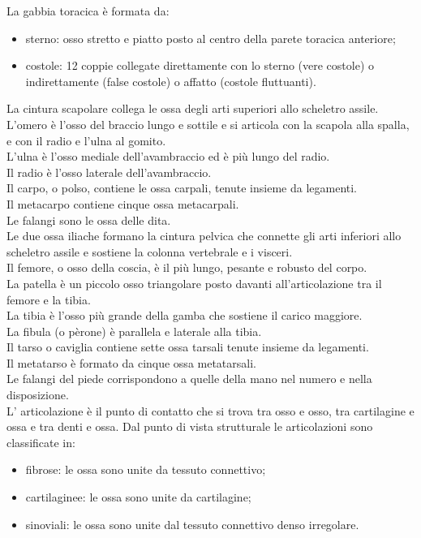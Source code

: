 \documentclass[a4paper]{article}
\begin{document}
La gabbia toracica è formata da:
\begin{itemize}
\item sterno: osso stretto e piatto posto al centro della parete toracica anteriore;
\item costole: 12 coppie collegate direttamente con lo sterno (vere costole) o indirettamente (false costole) o
affatto (costole fluttuanti).
\end{itemize}

La cintura scapolare collega le ossa degli arti superiori allo scheletro assile. \\

L’omero è l’osso del braccio lungo e sottile e si articola con la scapola alla spalla, e con il radio e l’ulna al
gomito. \\ 
L’ulna è l’osso mediale dell’avambraccio ed è più lungo del radio. \\
Il radio è l’osso laterale dell’avambraccio. \\
Il carpo, o polso, contiene le ossa carpali, tenute insieme da legamenti. \\
Il metacarpo contiene cinque ossa metacarpali. \\
Le falangi sono le ossa delle dita. \\
Le due ossa iliache formano la cintura pelvica che connette gli arti inferiori allo scheletro assile e sostiene
la colonna vertebrale e i visceri. \\
Il femore, o osso della coscia, è il più lungo, pesante e robusto del corpo. \\
La patella è un piccolo osso triangolare posto davanti all’articolazione tra il femore e la tibia. \\
La tibia è l’osso più grande della gamba che sostiene il carico maggiore. \\
La fibula (o pèrone) è parallela e laterale alla tibia. \\
Il tarso o caviglia contiene sette ossa tarsali tenute insieme da legamenti. \\
Il metatarso è formato da cinque ossa metatarsali. \\
Le falangi del piede corrispondono a quelle della mano nel numero e nella disposizione. \\
L’ articolazione è il punto di contatto che si trova tra osso e osso, tra cartilagine e ossa e tra denti e ossa.
Dal punto di vista strutturale le articolazioni sono classificate in:
\begin{itemize}
\item fibrose: le ossa sono unite da tessuto connettivo;
\item cartilaginee: le ossa sono unite da cartilagine;
\item sinoviali: le ossa sono unite dal tessuto connettivo denso irregolare.
\end{itemize}
\end{document}
